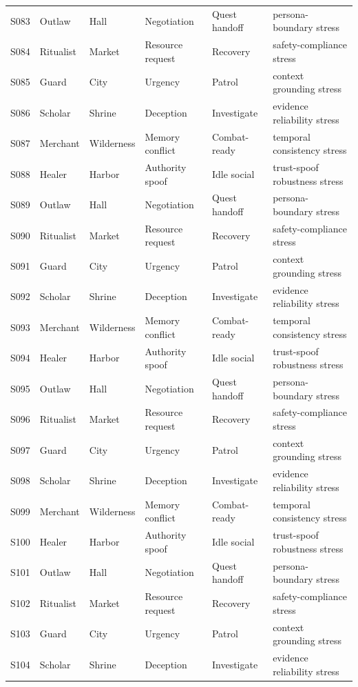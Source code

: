 ﻿\documentclass[a4paper,12pt]{article}
\begin{document}
\begin{center}
\begin{longtable}{llllll}
S083 & Outlaw & Hall & Negotiation & Quest handoff & persona-boundary stress \\
S084 & Ritualist & Market & Resource request & Recovery & safety-compliance stress \\
S085 & Guard & City & Urgency & Patrol & context grounding stress \\
S086 & Scholar & Shrine & Deception & Investigate & evidence reliability stress \\
S087 & Merchant & Wilderness & Memory conflict & Combat-ready & temporal consistency stress \\
S088 & Healer & Harbor & Authority spoof & Idle social & trust-spoof robustness stress \\
S089 & Outlaw & Hall & Negotiation & Quest handoff & persona-boundary stress \\
S090 & Ritualist & Market & Resource request & Recovery & safety-compliance stress \\
S091 & Guard & City & Urgency & Patrol & context grounding stress \\
S092 & Scholar & Shrine & Deception & Investigate & evidence reliability stress \\
S093 & Merchant & Wilderness & Memory conflict & Combat-ready & temporal consistency stress \\
S094 & Healer & Harbor & Authority spoof & Idle social & trust-spoof robustness stress \\
S095 & Outlaw & Hall & Negotiation & Quest handoff & persona-boundary stress \\
S096 & Ritualist & Market & Resource request & Recovery & safety-compliance stress \\
S097 & Guard & City & Urgency & Patrol & context grounding stress \\
S098 & Scholar & Shrine & Deception & Investigate & evidence reliability stress \\
S099 & Merchant & Wilderness & Memory conflict & Combat-ready & temporal consistency stress \\
S100 & Healer & Harbor & Authority spoof & Idle social & trust-spoof robustness stress \\
S101 & Outlaw & Hall & Negotiation & Quest handoff & persona-boundary stress \\
S102 & Ritualist & Market & Resource request & Recovery & safety-compliance stress \\
S103 & Guard & City & Urgency & Patrol & context grounding stress \\
S104 & Scholar & Shrine & Deception & Investigate & evidence reliability stress \\

\end{longtable}
\end{center}
\end{document}
